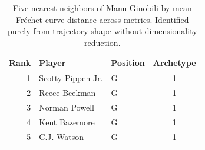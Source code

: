 \begin{table}[htbp]
  \centering\small
  \begin{tabular}{rllc}
    \toprule
    Rank & Player & Position & Archetype \\
    \midrule
    1 & Scotty Pippen Jr. & G & 1 \\
    2 & Reece Beekman & G & 1 \\
    3 & Norman Powell & G & 1 \\
    4 & Kent Bazemore & G & 1 \\
    5 & C.J. Watson & G & 1 \\
    \bottomrule
  \end{tabular}
  \caption{Five nearest neighbors of Manu Ginobili by mean Fr\'{e}chet curve distance across metrics. Identified purely from trajectory shape without dimensionality reduction.}
  \label{tab:Manu_Ginobili_frechet_curve_neighbors}
\end{table}

